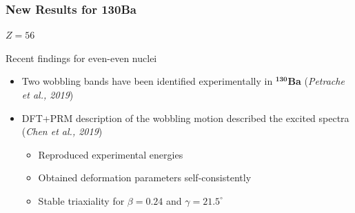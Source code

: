 \documentclass{beamer}
\begin{document}
\begin{frame}
  \frametitle{New Results for 130Ba}
  \begin{minipage}{.8\textwidth}
    $Z=56$
    \begin{block}{Recent findings for even-even nuclei}
      \begin{itemize}
        \item Two wobbling bands have been identified experimentally in \textbf{$^\mathbf{130}$Ba} (\textit{Petrache et al., 2019})
        \item DFT+PRM description of the wobbling motion described the excited spectra (\textit{Chen et al., 2019})
        \begin{itemize}
          \item Reproduced experimental energies
          \item Obtained deformation parameters self-consistently
          \item Stable triaxiality for $\beta=0.24$ and $\gamma=21.5^\circ$
        \end{itemize}
      \end{itemize}
    \end{block}
  \end{minipage}%
  \begin{minipage}{.2\textwidth}
    \begin{figure}
      \centering

\end{figure}
\end{minipage}
\end{frame}
\end{document}
